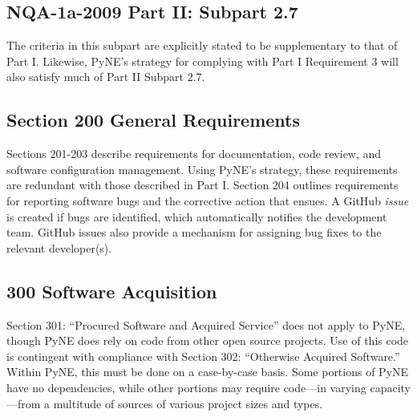 \documentclass{anstrans}
\begin{document}
\subsection{NQA-1a-2009 Part II: Subpart 2.7}

The criteria in this subpart are explicitly stated to be supplementary to that
of Part I. Likewise, PyNE's strategy for complying with Part I Requirement 3 will also satisfy much of Part II Subpart 2.7.

\subsection{Section 200 General Requirements}

Sections 201-203 describe requirements for documentation, code review, and
software configuration management. Using PyNE's strategy, these requirements are redundant with those described in Part I.
Section 204 outlines requirements for reporting software bugs and the corrective
action that ensues. A GitHub \emph{issue} is created if bugs are identified, which
automatically notifies the development team. GitHub
issues also provide a mechanism for assigning bug fixes to the relevant
developer(s). 


\subsection{300 Software Acquisition}

Section 301: ``Procured Software and Acquired Service'' does not apply to PyNE,
though PyNE does rely on code from other open source projects. Use of this code
is contingent with compliance with Section 302: ``Otherwise Acquired Software.''
Within PyNE, this must be done on a case-by-case basis. Some portions of PyNE
have no dependencies, while other portions may require code---in varying capacity---from a multitude of
sources of various project sizes and types.
\end{document}
